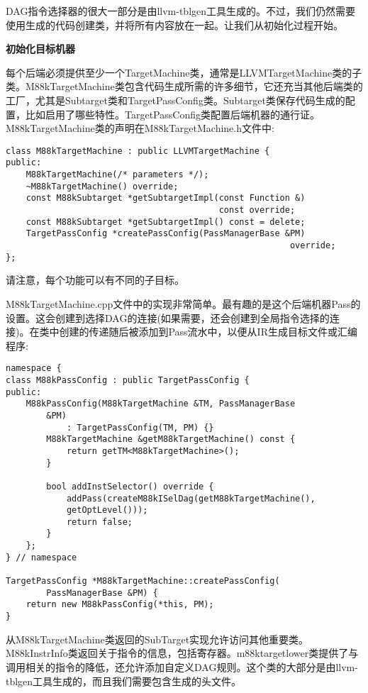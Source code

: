 
DAG指令选择器的很大一部分是由llvm-tblgen工具生成的。不过，我们仍然需要使用生成的代码创建类，并将所有内容放在一起。让我们从初始化过程开始。\par

\hspace*{\fill} \par %
\textbf{初始化目标机器}

每个后端必须提供至少一个TargetMachine类，通常是LLVMTargetMachine类的子类。M88k\allowbreak TargetMachine类包含代码生成所需的许多细节，它还充当其他后端类的工厂，尤其是Subtarget类和TargetPassConfig类。Subtarget类保存代码生成的配置，比如启用了哪些特性。TargetPassConfig类配置后端机器的通行证。M88kTargetMachine类的声明在M88kTargetMachine.h文件中:\par

\begin{lstlisting}[caption={}]
class M88kTargetMachine : public LLVMTargetMachine {
public:
	M88kTargetMachine(/* parameters */);
	~M88kTargetMachine() override;
	const M88kSubtarget *getSubtargetImpl(const Function &)
										  const override;
	const M88kSubtarget *getSubtargetImpl() const = delete;
	TargetPassConfig *createPassConfig(PassManagerBase &PM)
														override;
};
\end{lstlisting}

请注意，每个功能可以有不同的子目标。\par

M88kTargetMachine.cpp文件中的实现非常简单。最有趣的是这个后端机器Pass的设置。这会创建到选择DAG的连接(如果需要，还会创建到全局指令选择的连接)。在类中创建的传递随后被添加到Pass流水中，以便从IR生成目标文件或汇编程序:\par

\begin{lstlisting}[caption={}]
namespace {
class M88kPassConfig : public TargetPassConfig {
public:
	M88kPassConfig(M88kTargetMachine &TM, PassManagerBase
		&PM)
			: TargetPassConfig(TM, PM) {}
		M88kTargetMachine &getM88kTargetMachine() const {
			return getTM<M88kTargetMachine>();
		}
	
		bool addInstSelector() override {
			addPass(createM88kISelDag(getM88kTargetMachine(),
			getOptLevel()));
			return false;
		}
	};
} // namespace

TargetPassConfig *M88kTargetMachine::createPassConfig(
		PassManagerBase &PM) {
	return new M88kPassConfig(*this, PM);
}
\end{lstlisting}

从M88kTargetMachine类返回的SubTarget实现允许访问其他重要类。M88kInstrInfo类返回关于指令的信息，包括寄存器。m88ktargetlower类提供了与调用相关的指令的降低，还允许添加自定义DAG规则。这个类的大部分是由llvm-tblgen工具生成的，而且我们需要包含生成的头文件。\par


